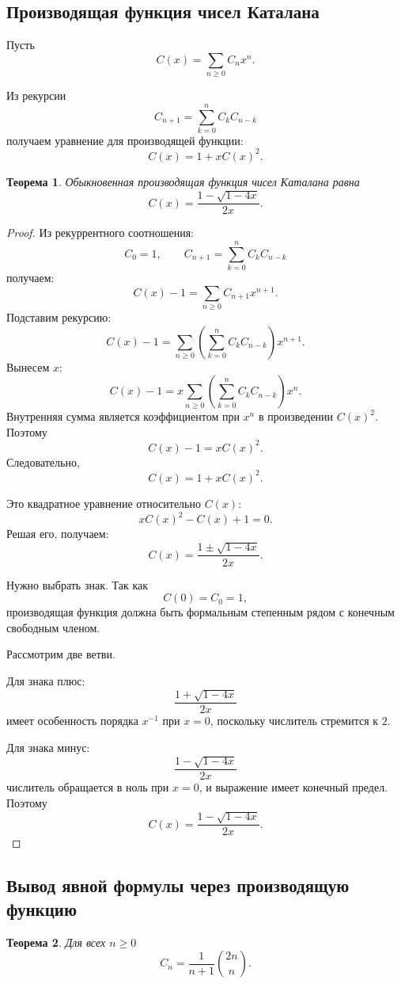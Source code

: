 \documentclass[12pt,a4paper]{article}
\newtheorem{theorem}{Теорема}
\begin{document}
\subsection{Производящая функция чисел Каталана}

Пусть
\[
C(x)=\sum_{n\ge 0}C_nx^n.
\]

Из рекурсии
\[
C_{n+1}=\sum_{k=0}^{n}C_kC_{n-k}
\]
получаем уравнение для производящей функции:
\[
C(x)=1+xC(x)^2.
\]

\begin{theorem}
Обыкновенная производящая функция чисел Каталана равна
\[
C(x)=\frac{1-\sqrt{1-4x}}{2x}.
\]
\end{theorem}

\begin{proof}
Из рекуррентного соотношения:
\[
C_0=1,\qquad C_{n+1}=\sum_{k=0}^{n}C_kC_{n-k}
\]
получаем:
\[
C(x)-1
=
\sum_{n\ge 0}C_{n+1}x^{n+1}.
\]
Подставим рекурсию:
\[
C(x)-1
=
\sum_{n\ge 0}\left(\sum_{k=0}^{n}C_kC_{n-k}\right)x^{n+1}.
\]
Вынесем $x$:
\[
C(x)-1
=
x\sum_{n\ge 0}\left(\sum_{k=0}^{n}C_kC_{n-k}\right)x^{n}.
\]
Внутренняя сумма является коэффициентом при $x^n$ в произведении $C(x)^2$. Поэтому
\[
C(x)-1=xC(x)^2.
\]
Следовательно,
\[
C(x)=1+xC(x)^2.
\]

Это квадратное уравнение относительно $C(x)$:
\[
xC(x)^2-C(x)+1=0.
\]
Решая его, получаем:
\[
C(x)=\frac{1\pm\sqrt{1-4x}}{2x}.
\]

Нужно выбрать знак. Так как
\[
C(0)=C_0=1,
\]
производящая функция должна быть формальным степенным рядом с конечным свободным членом.

Рассмотрим две ветви.

Для знака плюс:
\[
\frac{1+\sqrt{1-4x}}{2x}
\]
имеет особенность порядка $x^{-1}$ при $x=0$, поскольку числитель стремится к $2$.

Для знака минус:
\[
\frac{1-\sqrt{1-4x}}{2x}
\]
числитель обращается в ноль при $x=0$, и выражение имеет конечный предел. Поэтому
\[
C(x)=\frac{1-\sqrt{1-4x}}{2x}.
\]
\end{proof}

\subsection{Вывод явной формулы через производящую функцию}

\begin{theorem}
Для всех $n\ge 0$
\[
C_n=\frac{1}{n+1}\binom{2n}{n}.
\]
\end{theorem}
\end{document}
